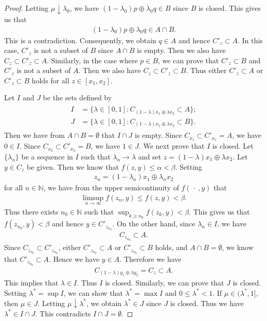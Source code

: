 \documentclass[draft]{amsart}
\numberwithin{equation}{section}
\def\N{\mathbb N}
\theoremstyle{plain}
\theoremstyle{definition}
\theoremstyle{remark}
\begin{document}
\begin{proof}
 Letting $\mu \downarrow \lambda_0$, we have 
 $(1-\lambda_0)p \oplus \lambda_0 q \in B$ 
 since $B$ is closed. 
 This gives us that 
 \begin{align}
  (1-\lambda_0)p \oplus \lambda_0 q \in A\cap B. 
 \end{align}
 This is a contradiction. Consequently, we obtain $q\in A$ 
 and hence $C'_z\subset A$. 
 In this case, 
 $C'_z$ is not a subset of $B$ since $A\cap B$ is empty. 
 Then we also have $C_z\subset C'_z\subset A$. 
 Similarly, in the case where $p\in B$, we can prove that 
 $C'_z\subset B$ and $C'_z$ is not a subset of $A$.
 Then we also have $C_z\subset C'_z\subset B$.  
 Thus either $C'_z\subset A$ or $C'_z\subset B$ 
 holds for all $z\in [x_1,x_2]$. 

 Let $I$ and $J$ be the sets defined by 
 \begin{align}
  \begin{split}
  I&=\bigl\{\lambda\in [0,1]: C_{(1-\lambda)x_1\oplus \lambda x_2} \subset A\bigr\}; \\
  J&=\bigl\{\lambda\in [0,1]: C_{(1-\lambda)x_1\oplus \lambda x_2} \subset B\bigr\}.    
  \end{split}
 \end{align}
 Then we have from $A\cap B=\emptyset$ that $I\cap J$ is empty. 
 Since $C_{x_1}\subset C'_{x_1}=A$, we have $0\in I$. 
 Since $C_{x_2}\subset C'_{x_2}=B$, we have $1\in J$. 
 We next prove that $I$ is closed. 
 Let $\{\lambda_n\}$ be a sequence in $I$ such that 
 $\lambda_n\to \lambda$ and set $z=(1-\lambda)x_1\oplus \lambda x_2$.  
 Let $y\in C_{z}$ be given. 
 Then we know that $f(z,y)\leq \alpha < \beta$. 
 Setting 
 \begin{align}
  z_n=(1-\lambda_n)x_1\oplus \lambda_n x_2
 \end{align}
 for all $n\in \N$, we have from the upper semicontinuity of $f(\,\cdot\,,y)$ that 
 \begin{align}
  \limsup_{n\to \infty}f(z_n, y)\leq f(z, y)<\beta. 
 \end{align}
 Thus there exists $n_0\in \N$ such that $\sup_{k\geq n_0}f(z_k,y)<\beta$. 
 This gives us that $f(z_{n_0},y)<\beta$ 
 and hence $y\in C'_{z_{n_0}}$. 
 On the other hand, since $\lambda_n \in I$, we have 
 \begin{align}
  C_{z_{n_0}}\subset A. 
 \end{align}
 Since $C_{z_{n_0}}\subset C'_{z_{n_0}}$, 
 either $C'_{z_{n_0}}\subset A$ or $C'_{z_{n_0}} \subset B$ holds, 
 and $A\cap B = \emptyset$, 
 we know that $C'_{z_{n_0}}\subset A$. 
 Hence we have $y\in A$. 
 Therefore we have 
 \begin{align}
  C_{(1-\lambda)y_1\oplus \lambda y_2} =C_z \subset A. 
 \end{align}
 This implies that $\lambda\in I$. Thus $I$ is closed. 
 Similarly, we can prove that $J$ is closed. 
 Setting $\lambda^*=\sup I$, we can show that 
 $\lambda^*=\max I$ and $0\leq \lambda^*<1$. 
 If $\mu \in (\lambda^*, 1]$,  
 then $\mu \in J$. Letting $\mu \downarrow \lambda^*$, 
 we obtain $\lambda^* \in J$ since $J$ is closed. Thus we have 
 $\lambda ^*\in I\cap J$. This contradicts $I\cap J=\emptyset$.  
\end{proof}
\end{document}
